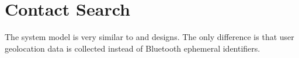 %
%
%

\section{Contact Search}\label{sec:contact-search}

\newcommand{\histories}{\vSet{H}}
\newcommand{\vLocation}{\ell}
\newcommand{\locations}{\mathbb{L}}
\newcommand{\locset}{\vSet{L}}
\newcommand{\latitude}{\phi}
\newcommand{\longitude}{\lambda}
\newcommand{\users}{\vSet{U}}
\newcommand{\sindex}{\vSet{I}}
\newcommand{\query}{\vSet{N}}
\newcommand{\qelement}{q}
\newcommand{\hone}{G}
\newcommand{\htwo}{H}
\newcommand{\neighbors}{\vSet{N}}


The system model is very similar to \citet{Ayday2020, Ayday2021} and designs. The only difference is that user geolocation data is collected instead of Bluetooth ephemeral identifiers.

